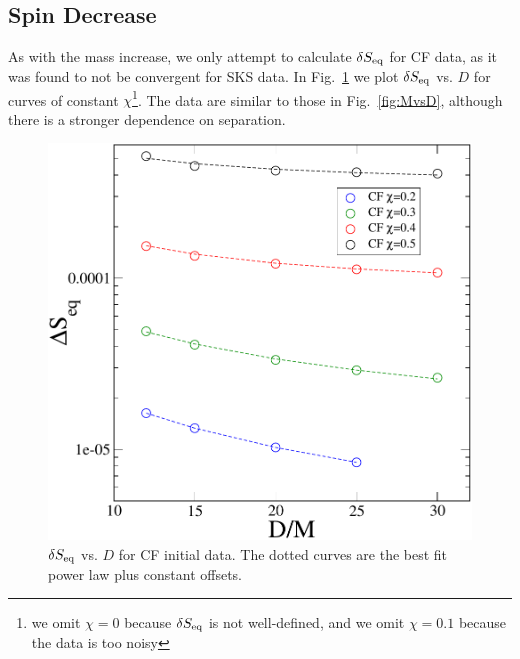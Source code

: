 


\subsection{Spin Decrease}
\label{subsec:SpinDecrease}
As with the mass increase, we only attempt to calculate $\delta S_{\rm
  eq}$ for CF data, as it was found to not be convergent for SKS
data. In Fig.~\ref{fig:SvsD} we plot $\delta S_{\rm eq}$ vs. $D$ for
curves of constant $\chi$\footnote{we omit $\chi=0$ because $\delta
  S_{\rm eq}$ is not well-defined, and we omit $\chi=0.1$ because the
  data is too noisy}. The data are similar to those in
Fig.~\ref{fig:MvsD}, although there is a stronger dependence on separation.

\begin{figure}[!htbp]
 \includegraphics[scale=0.95]{chap5/SvsD2}
  \caption{$\delta S_{\rm eq}$ vs. $D$ for CF initial data. The dotted
    curves are the best fit power law plus constant offsets.}
  \label{fig:SvsD}
\end{figure}

